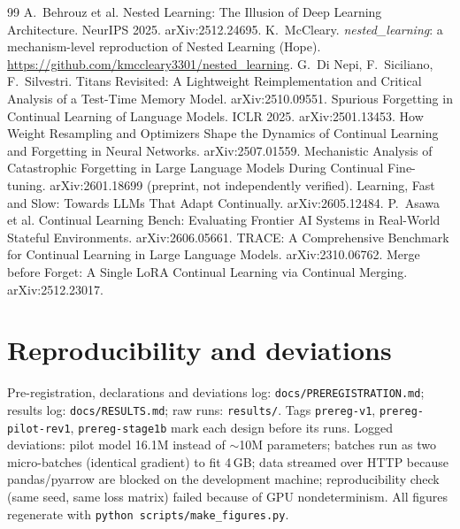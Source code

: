\documentclass[10pt]{article}
\begin{document}
\begin{thebibliography}{99}\small
{} A.~Behrouz et al. Nested Learning: The Illusion of Deep Learning Architecture. NeurIPS 2025. arXiv:2512.24695.
 K.~McCleary. \emph{nested\_learning}: a mechanism-level reproduction of Nested Learning (Hope). \url{https://github.com/kmccleary3301/nested_learning}.
 G.~Di Nepi, F.~Siciliano, F.~Silvestri. Titans Revisited: A Lightweight Reimplementation and Critical Analysis of a Test-Time Memory Model. arXiv:2510.09551.
 Spurious Forgetting in Continual Learning of Language Models. ICLR 2025. arXiv:2501.13453.
 How Weight Resampling and Optimizers Shape the Dynamics of Continual Learning and Forgetting in Neural Networks. arXiv:2507.01559.
 Mechanistic Analysis of Catastrophic Forgetting in Large Language Models During Continual Fine-tuning. arXiv:2601.18699 (preprint, not independently verified).
 Learning, Fast and Slow: Towards LLMs That Adapt Continually. arXiv:2605.12484.
 P.~Asawa et al. Continual Learning Bench: Evaluating Frontier AI Systems in Real-World Stateful Environments. arXiv:2606.05661.
 TRACE: A Comprehensive Benchmark for Continual Learning in Large Language Models. arXiv:2310.06762.
 Merge before Forget: A Single LoRA Continual Learning via Continual Merging. arXiv:2512.23017.
\end{thebibliography}

\appendix
\section{Reproducibility and deviations}
Pre-registration, declarations and deviations log: \texttt{docs/PREREGISTRATION.md}; results log: \texttt{docs/RESULTS.md}; raw runs: \texttt{results/}. Tags
\texttt{prereg-v1}, \texttt{prereg-pilot-rev1}, \texttt{prereg-stage1b} mark each design before its runs. Logged deviations: pilot model 16.1M instead of $\sim$10M parameters; batches run as two micro-batches (identical gradient) to fit 4\,GB;
data streamed over HTTP because pandas/pyarrow are blocked on the development machine; reproducibility check (same seed, same loss matrix) failed because of GPU nondeterminism.
All figures regenerate with \texttt{python scripts/make\_figures.py}.
\end{document}
